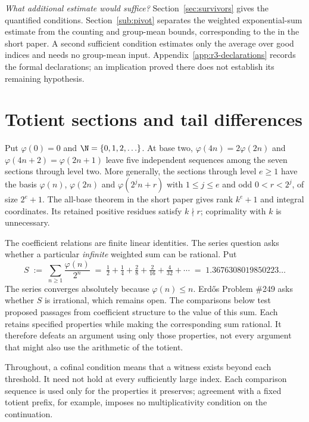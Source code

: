 \emph{What additional estimate would suffice?}
Section~\ref{sec:survivors} gives the quantified conditions.
Section~\ref{sub:pivot} separates the weighted exponential-sum estimate
from the counting and group-mean bounds, corresponding to the
 in the
short paper. A second sufficient condition estimates only the average
over good indices and needs no group-mean input.
Appendix~\ref{app:r3-declarations} records the formal declarations;
an implication proved there does not establish its remaining hypothesis.

\setcounter{tocdepth}{1}
\clearpage
\tableofcontents
\clearpage
\section{Totient sections and tail differences}

Put $\varphi(0)=0$ and $\N=\{0,1,2,\ldots\}$. At base two,
$\varphi(4n)=2\varphi(2n)$ and $\varphi(4n+2)=\varphi(2n+1)$ leave five
independent sequences among the seven sections through level two.
More generally, the sections through level $e\ge1$ have the basis
$\varphi(n)$, $\varphi(2n)$ and $\varphi(2^jn+r)$ with
$1\le j\le e$ and odd $0<r<2^j$, of size $2^e+1$.
The all-base theorem in the short paper gives rank $k^e+1$ and integral
coordinates. Its retained positive residues satisfy $k\nmid r$;
coprimality with $k$ is unnecessary.

The coefficient relations are finite linear identities. The series
question asks whether a particular \emph{infinite} weighted sum can
be rational. Put
\[
  S \;:=\; \sum_{n \ge 1} \frac{\varphi(n)}{2^{n}}
  \;=\; \tfrac12 + \tfrac14 + \tfrac{2}{8} + \tfrac{2}{16} + \tfrac{4}{32} + \cdots
  \;=\; 1.3676308019850223\ldots
\]
The series converges absolutely because $\varphi(n) \le n$. Erd\H{o}s Problem
\#249 asks whether $S$ is irrational, which remains open. The comparisons below test proposed passages from coefficient structure
to the value of this sum. Each retains specified properties while making
the corresponding sum rational. It therefore defeats an argument using
only those properties, not every argument that might also use the
arithmetic of the totient.

Throughout, a cofinal condition means that a witness exists beyond each
threshold. It need not hold at every sufficiently large index. Each
comparison sequence is used only for the properties it preserves;
agreement with a fixed totient prefix, for example, imposes no
multiplicativity condition on the continuation.

